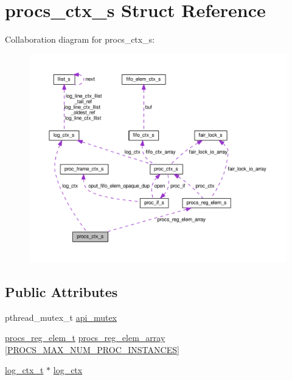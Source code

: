 \hypertarget{structprocs__ctx__s}{}\section{procs\+\_\+ctx\+\_\+s Struct Reference}
\label{structprocs__ctx__s}


Collaboration diagram for procs\+\_\+ctx\+\_\+s\+:\nopagebreak
\begin{figure}[H]
\begin{center}
\leavevmode
\includegraphics[width=350pt]{structprocs__ctx__s__coll__graph}
\end{center}
\end{figure}
\subsection*{Public Attributes}
\begin{DoxyCompactItemize}
\item 
pthread\+\_\+mutex\+\_\+t \hyperlink{structprocs__ctx__s_a27330c986436226abfa1b5a00b7bdeb1}{api\+\_\+mutex}
\item 
\hyperlink{procs_8c_a63a78f7c86536e71715f3fcef28e11c5}{procs\+\_\+reg\+\_\+elem\+\_\+t} \hyperlink{structprocs__ctx__s_a08985565adf1f547b44b58addd85cbbe}{procs\+\_\+reg\+\_\+elem\+\_\+array} \mbox{[}\hyperlink{procs_8c_a3ed23854256df248c5c1352b3999275e}{P\+R\+O\+C\+S\+\_\+\+M\+A\+X\+\_\+\+N\+U\+M\+\_\+\+P\+R\+O\+C\+\_\+\+I\+N\+S\+T\+A\+N\+C\+ES}\mbox{]}
\item 
\hyperlink{structlog__ctx__s}{log\+\_\+ctx\+\_\+t} $\ast$ \hyperlink{structprocs__ctx__s_ab5d529e82924052baf26478afca901fa}{log\+\_\+ctx}
\end{DoxyCompactItemize}


